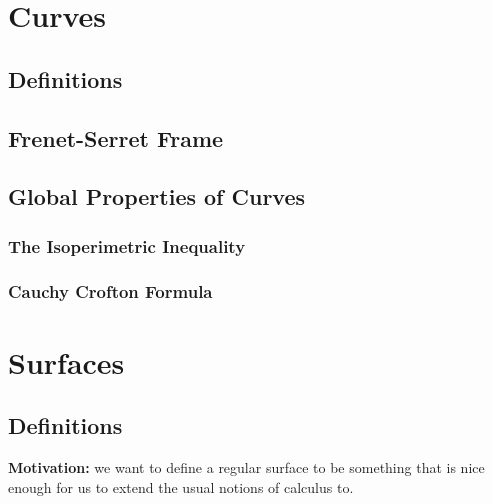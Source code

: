 \documentclass[11pt]{scrartcl}
\theoremstyle{definition}
\theoremstyle{remark}
\begin{document}
\section{Curves}

\subsection{Definitions}

\subsection{Frenet-Serret Frame}

\subsection{Global Properties of Curves}

\subsubsection{The Isoperimetric Inequality}

\subsubsection{Cauchy Crofton Formula}




\section{Surfaces}

\subsection{Definitions}

\textbf{Motivation:} we want to define a regular surface to be something that is nice enough for us to extend the usual notions of calculus to. 
\end{document}
